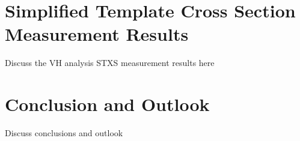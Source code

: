 \documentclass{umassthesis}          %
\begin{document}
\chapter{Simplified Template Cross Section Measurement Results}\label{ch:vh_stxs_results}
Discuss the VH analysis STXS measurement results here

\chapter{Conclusion and Outlook}\label{ch:conclusions}
Discuss conclusions and outlook





\end{document}
